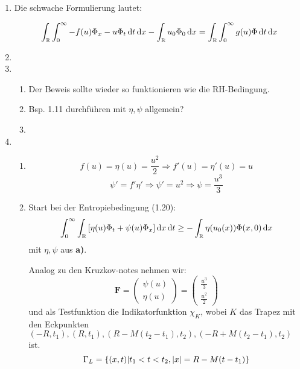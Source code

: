 \documentclass[a4paper,11pt]{scrartcl}
\newcommand*{\R}{\mathbb{R}}
\newcommand*{\F}{\mathbf{F}}
\newcommand*{\dx}{\dif{}x}
\newcommand*{\dt}{\dif{}t}
\newcommand*{\Ix}[1]{\int_{\R}{#1}\dx}
\newcommand*{\It}[1]{\int_0^\infty{#1}\dt}
\begin{document}
\begin{enumerate}[label*=\textbf{3.\arabic*.}]

\item
  Die schwache Formulierung lautet:

  \[ \Ix{\It{-f(u) \Phi_x - u \Phi_t}} - \Ix{u_0 \Phi_0} = \Ix{\It{g(u) \Phi}} \]




\item

\item
  \begin{enumerate}[label=\textbf{\alph*)}]
    \item Der Beweis sollte wieder so funktionieren wie die RH-Bedingung.
    \item Bsp. 1.11 durchführen mit $\eta, \psi$ allgemein?
    \item
  \end{enumerate}


\item
  \begin{enumerate}[label=\textbf{\alph*)}]
  \item
    \[ f(u) = \eta(u) = \frac{u^2}{2} \Rightarrow f'(u) = \eta'(u) = u\]
    \[\psi' = f' \eta' \Rightarrow \psi' = u^2 \Rightarrow \psi = \frac{u^3}{3} \]

  \item
    Start bei der Entropiebedingung (1.20):
    \[ \It{\Ix{[\eta(u)\Phi_t + \psi(u)\Phi_x]}} \geq - \Ix{\eta(u_0(x))\Phi(x, 0)}\]
    mit $\eta, \psi$ aus \textbf{a)}.

    Analog zu den Kruzkov-notes nehmen wir:
    \[ \F = \begin{pmatrix}\psi(u)\\ \eta(u)\end{pmatrix} =
      \begin{pmatrix}
        \frac{u^3}{3}\\\frac{u^2}{2}
      \end{pmatrix}
    \]
    und als Testfunktion die Indikatorfunktion $\chi_K$,
    wobei $K$ das Trapez mit den Eckpunkten
    $(-R, t_1), (R, t_1), (R-M(t_2-t_1), t_2), (-R+M(t_2-t_1), t_2)$ ist.
    \[\Gamma_L = \{(x,t) | t_1 < t < t_2, \, \abs{x} = R - M(t-t_1)\}\]


\end{enumerate}
\end{enumerate}
\end{document}
